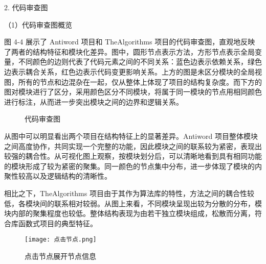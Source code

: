 2. 代码审查图

（1）代码审查图概览

图 4-4 展示了 Antiword 项目和 TheAlgorithms 项目的代码审查图，直观地反映了两者的结构特征和模块化差异。图中，圆形节点表示方法，方形节点表示全局变量，不同颜色的边则代表了代码元素之间的不同关系：蓝色边表示依赖关系，绿色边表示耦合关系，红色边表示代码变更影响关系。上方的图是未区分模块的全局视图，所有的节点和边混杂在一起，仅从整体上体现了项目的结构复杂度。而下方的图对模块进行了区分，采用颜色区分不同模块，将属于同一模块的节点用相同颜色进行标注，从而进一步突出模块之间的边界和逻辑关系。

\begin{figure}[!h]
    \setlength{\subfigcapskip}{-1bp}
    \centering
    \begin{minipage}{\textwidth}
    \centering
    \hspace{2em}
    \end{minipage}
    \centering
    \begin{minipage}{\textwidth}
    \centering
    \hspace{2em}
    \end{minipage}
    \vspace{0.2em}
    \caption{代码审查图} %
\end{figure}


从图中可以明显看出两个项目在结构特征上的显著差异。Antiword 项目整体模块之间高度协作，共同实现一个完整的功能，因此模块之间的联系较为紧密，表现出较强的耦合性。从可视化图上观察，按模块划分后，可以清晰地看到具有相同功能的模块形成了较为紧密的聚集。同一颜色的节点集中分布，进一步体现了模块的内聚性较高以及逻辑结构的清晰性。

相比之下，TheAlgorithms 项目由于其作为算法库的特性，方法之间的耦合性较低，各模块间的联系相对较弱。从图上来看，不同模块呈现出较为分散的分布，模块内部的聚集程度也较低。整体结构表现为由若干独立模块组成，松散而分离，符合库函数式项目的典型特征。

\begin{figure}[h]
\centering
\texttt{[image: 点击节点.png]}
\caption{点击节点展开节点信息}
\end{figure}

